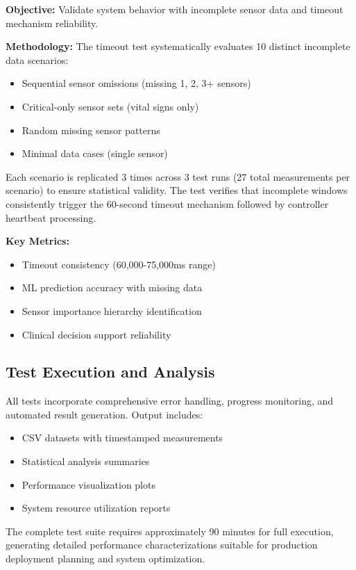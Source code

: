 \textbf{Objective:} Validate system behavior with incomplete sensor data and timeout mechanism reliability.

\textbf{Methodology:} The timeout test systematically evaluates 10 distinct incomplete data scenarios:
\begin{itemize}
    \item Sequential sensor omissions (missing 1, 2, 3+ sensors)
    \item Critical-only sensor sets (vital signs only)
    \item Random missing sensor patterns
    \item Minimal data cases (single sensor)
\end{itemize}

Each scenario is replicated 3 times across 3 test runs (27 total measurements per scenario) to ensure statistical validity. The test verifies that incomplete windows consistently trigger the 60-second timeout mechanism followed by controller heartbeat processing.

\textbf{Key Metrics:}
\begin{itemize}
    \item Timeout consistency (60,000-75,000ms range)
    \item ML prediction accuracy with missing data
    \item Sensor importance hierarchy identification
    \item Clinical decision support reliability
\end{itemize}

\subsection{Test Execution and Analysis}
\label{subsec:test-execution}

All tests incorporate comprehensive error handling, progress monitoring, and automated result generation. Output includes:
\begin{itemize}
    \item CSV datasets with timestamped measurements
    \item Statistical analysis summaries
    \item Performance visualization plots
    \item System resource utilization reports
\end{itemize}

The complete test suite requires approximately 90 minutes for full execution, generating detailed performance characterizations suitable for production deployment planning and system optimization.

